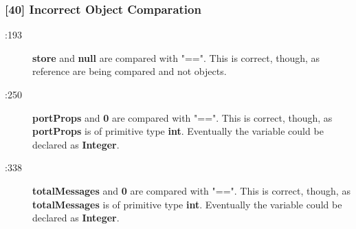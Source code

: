 \subsubsection{[40] Incorrect Object Comparation}
\begin{description}
	\item[:193] \textbf{store} and \textbf{null} are compared with "==". This is correct, though, as reference are being compared and not objects.  
	\item[:250] \textbf{portProps} and \textbf{0} are compared with "==". This is correct, though, as \textbf{portProps} is of primitive type \textbf{int}. Eventually the variable could be declared as \textbf{Integer}.
	\item[:338] \textbf{totalMessages} and \textbf{0} are compared with "==". This is correct, though, as \textbf{totalMessages} is of primitive type \textbf{int}. Eventually the variable could be declared as \textbf{Integer}.
\end{description}